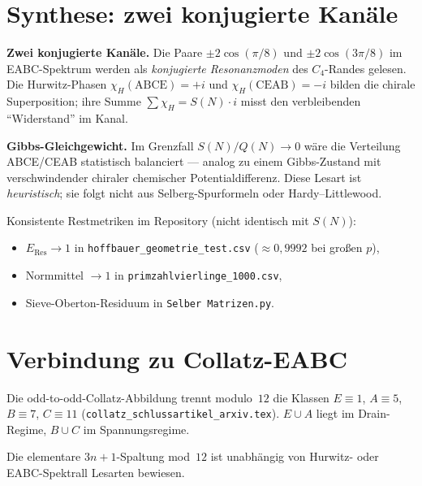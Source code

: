 \documentclass[12pt,a4paper]{article}
\begin{document}
\section{Synthese: zwei konjugierte Kanäle}
\label{sec:synthese}

\begin{tcolorbox}[heuristik,title={Modellhypothese (orange) --- kein Beweis}]
\textbf{Zwei konjugierte Kanäle.}
Die Paare $\pm 2\cos(\pi/8)$ und $\pm 2\cos(3\pi/8)$ im EABC-Spektrum
werden als \emph{konjugierte Resonanzmoden} des $C_4$-Randes gelesen.
Die Hurwitz-Phasen $\chi_H(\mathrm{ABCE})=+i$ und
$\chi_H(\mathrm{CEAB})=-i$ bilden die chirale Superposition;
ihre Summe $\sum\chi_H = S(N)\cdot i$ misst den verbleibenden
``Widerstand'' im Kanal.

\textbf{Gibbs-Gleichgewicht.}
Im Grenzfall $S(N)/Q(N)\to 0$ wäre die Verteilung ABCE/CEAB
statistisch balanciert --- analog zu einem Gibbs-Zustand mit
verschwindender chiraler chemischer Potentialdifferenz.
Diese Lesart ist \emph{heuristisch}; sie folgt nicht aus
Selberg-Spurformeln oder Hardy--Littlewood.
\end{tcolorbox}

Konsistente Restmetriken im Repository (nicht identisch mit $S(N)$):
\begin{itemize}[nosep]
  \item $E_{\mathrm{Res}}\to 1$ in \texttt{hoffbauer\_geometrie\_test.csv}
        ($\approx 0{,}9992$ bei großen $p$),
  \item Normmittel $\to 1$ in \texttt{primzahlvierlinge\_1000.csv},
  \item Sieve-Oberton-Residuum in \texttt{Selber Matrizen.py}.
\end{itemize}

\section{Verbindung zu Collatz-EABC}
\label{sec:collatz}

Die odd-to-odd-Collatz-Abbildung trennt modulo~$12$ die Klassen
$E\equiv 1$, $A\equiv 5$, $B\equiv 7$, $C\equiv 11$
(\texttt{collatz\_schlussartikel\_arxiv.tex}).
$E\cup A$ liegt im Drain-Regime, $B\cup C$ im Spannungsregime.

\begin{tcolorbox}[bewiesen]
Die elementare $3n+1$-Spaltung mod~$12$ ist unabhängig von
Hurwitz- oder EABC-Spektrall Lesarten bewiesen.
\end{tcolorbox}
\end{document}

